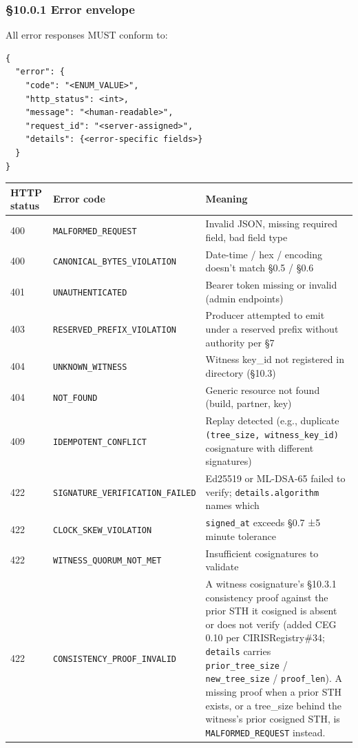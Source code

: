 \documentclass[11pt]{article}
\begin{document}
\subsubsection*{§10.0.1 Error envelope}


All error responses MUST conform to:


\begin{lstlisting}
{
  "error": {
    "code": "<ENUM_VALUE>",
    "http_status": <int>,
    "message": "<human-readable>",
    "request_id": "<server-assigned>",
    "details": {<error-specific fields>}
  }
}
\end{lstlisting}

{\footnotesize
\begin{longtable}{|p{5.33cm}|p{5.33cm}|p{5.33cm}|}\hline
\textbf{HTTP status} & \textbf{Error code} & \textbf{Meaning} \\ \hline\endhead
400 & \texttt{MALFORMED\_REQUEST} & Invalid JSON, missing required field, bad field type \\ \hline
400 & \texttt{CANONICAL\_BYTES\_VIOLATION} & Date-time / hex / encoding doesn't match §0.5 / §0.6 \\ \hline
401 & \texttt{UNAUTHENTICATED} & Bearer token missing or invalid (admin endpoints) \\ \hline
403 & \texttt{RESERVED\_PREFIX\_VIOLATION} & Producer attempted to emit under a reserved prefix without authority per §7 \\ \hline
404 & \texttt{UNKNOWN\_WITNESS} & Witness key\_id not registered in directory (§10.3) \\ \hline
404 & \texttt{NOT\_FOUND} & Generic resource not found (build, partner, key) \\ \hline
409 & \texttt{IDEMPOTENT\_CONFLICT} & Replay detected (e.g., duplicate \texttt{(tree\_size, witness\_key\_id)} cosignature with different signatures) \\ \hline
422 & \texttt{SIGNATURE\_VERIFICATION\_FAILED} & Ed25519 or ML-DSA-65 failed to verify; \texttt{details.algorithm} names which \\ \hline
422 & \texttt{CLOCK\_SKEW\_VIOLATION} & \texttt{signed\_at} exceeds §0.7 ±5 minute tolerance \\ \hline
422 & \texttt{WITNESS\_QUORUM\_NOT\_MET} & Insufficient cosignatures to validate \\ \hline
422 & \texttt{CONSISTENCY\_PROOF\_INVALID} & A witness cosignature's §10.3.1 consistency proof against the prior STH it cosigned is absent or does not verify (added CEG 0.10 per CIRISRegistry\#34; \texttt{details} carries \texttt{prior\_tree\_size} / \texttt{new\_tree\_size} / \texttt{proof\_len}). A missing proof when a prior STH exists, or a tree\_size behind the witness's prior cosigned STH, is \texttt{MALFORMED\_REQUEST} instead. \\ \hline

\end{longtable}}
\end{document}

